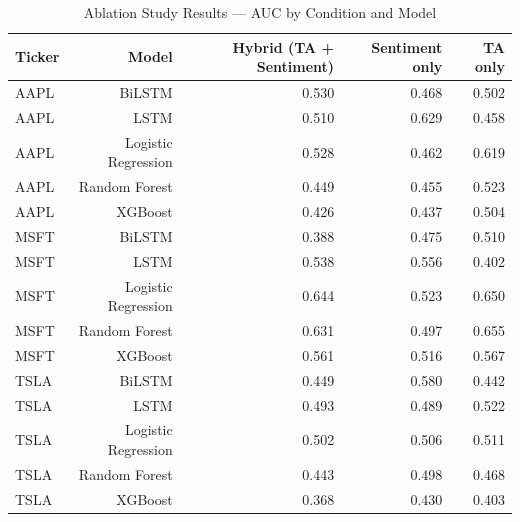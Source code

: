 \begin{table}[h]
\centering
\caption{Ablation Study Results — AUC by Condition and Model}
\label{tab:ablation}
\begin{tabular}{lrrrr}
\hline
Ticker & Model & Hybrid (TA + Sentiment) & Sentiment only & TA only \\
\hline
AAPL & BiLSTM & 0.530 & 0.468 & 0.502 \\
AAPL & LSTM & 0.510 & 0.629 & 0.458 \\
AAPL & Logistic Regression & 0.528 & 0.462 & 0.619 \\
AAPL & Random Forest & 0.449 & 0.455 & 0.523 \\
AAPL & XGBoost & 0.426 & 0.437 & 0.504 \\
MSFT & BiLSTM & 0.388 & 0.475 & 0.510 \\
MSFT & LSTM & 0.538 & 0.556 & 0.402 \\
MSFT & Logistic Regression & 0.644 & 0.523 & 0.650 \\
MSFT & Random Forest & 0.631 & 0.497 & 0.655 \\
MSFT & XGBoost & 0.561 & 0.516 & 0.567 \\
TSLA & BiLSTM & 0.449 & 0.580 & 0.442 \\
TSLA & LSTM & 0.493 & 0.489 & 0.522 \\
TSLA & Logistic Regression & 0.502 & 0.506 & 0.511 \\
TSLA & Random Forest & 0.443 & 0.498 & 0.468 \\
TSLA & XGBoost & 0.368 & 0.430 & 0.403 \\
\hline
\end{tabular}
\end{table}